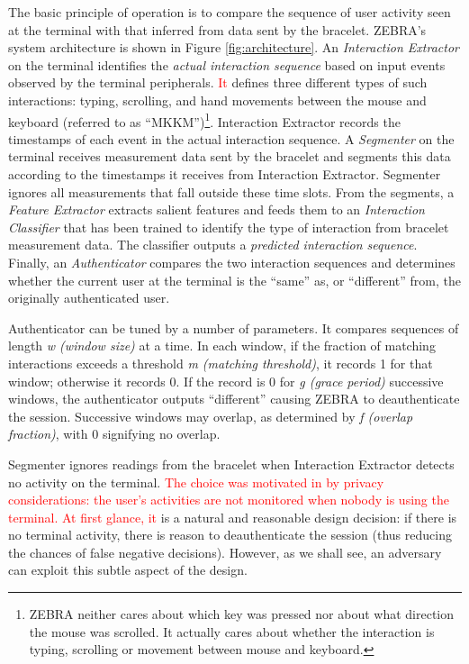 \documentclass[conference]{IEEEtran}
\newcommand{\zebra}{ZEBRA\xspace}
\newcommand\changeMika[1]{\textcolor{red}{#1}}
\newcommand\changeAsokan[1]{\textcolor{red}{#1}}
\newcommand\added[1]{{#1}}
\newcommand\changeMika[1]{{#1}}
\newcommand\changeAsokan[1]{{#1}}
\begin{document}
The basic principle of operation is to compare the sequence of user activity seen at the terminal with that inferred from data sent by the bracelet. \zebra's system architecture is shown in Figure \ref{fig:architecture}. An \textit{Interaction Extractor} on the terminal identifies the \textit{actual interaction sequence} based on input events observed by the terminal peripherals. \changeAsokan{It} defines three different types of such interactions: typing, scrolling, and hand movements between the mouse and keyboard (referred to as ``MKKM'')\footnote{\added{\zebra neither cares about which key was pressed nor about what direction the mouse was scrolled. It actually cares about whether the interaction is typing, scrolling or movement between mouse and keyboard.}}.  Interaction Extractor records the timestamps of each event in the actual interaction sequence.
A \textit{Segmenter} on the terminal receives measurement data sent by the bracelet
and segments this data according to the timestamps it receives from Interaction Extractor.
Segmenter ignores all measurements that fall outside these time slots. From the segments, a \textit{Feature Extractor} extracts salient features and feeds them to an \textit{Interaction Classifier} that has been trained to identify the type of interaction from bracelet measurement data.
The classifier outputs a \textit{predicted interaction sequence}. Finally, an \textit{Authenticator} compares the two interaction sequences and determines whether the current user at the terminal is the ``same'' as, or ``different'' from, the originally authenticated user.

Authenticator can be tuned by a number of parameters. It compares sequences of length \textit{w (window size)} at a time. In each window, if the fraction of matching interactions exceeds a threshold \textit{m (matching threshold)}, it records 1 for that window; otherwise it records 0. If the record is 0 for \textit{g (grace period)} successive windows, the authenticator outputs ``different'' causing \zebra to deauthenticate the session. Successive windows may overlap, as determined by \textit{f (overlap fraction)}, with 0 signifying no overlap.

Segmenter ignores readings from the bracelet when Interaction Extractor detects no activity on the terminal. \changeMika{The choice was motivated in} \changeAsokan{\cite{mare2014zebra} by privacy considerations: the user's activities are} \changeMika{not monitored when nobody is using the terminal.} \changeAsokan{At first glance, it} is a natural and reasonable design decision: if there is no terminal activity, there is reason to deauthenticate the session (thus reducing the chances of false negative decisions). However, as we shall see, an adversary can exploit this subtle aspect of the design.
\end{document}
